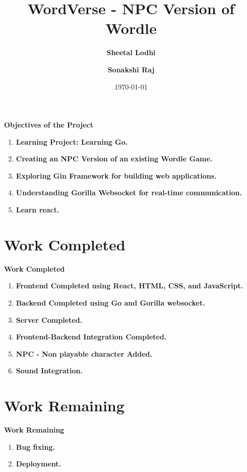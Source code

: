 \documentclass{beamer}
\title{WordVerse - NPC Version of Wordle}
\subtitle{}
\author{\bfseries Sheetal Lodhi \and \bfseries Sonakshi Raj }
\date{\today}
\begin{document}
\begin{frame}
    \titlepage 
\end{frame}

\section{}

\begin{frame}{\bfseries Objectives of the Project}
    \begin{enumerate}
        \item \bfseries Learning Project: Learning Go.
        \item \bfseries Creating an NPC Version of an existing Wordle Game.
        \item \bfseries Exploring Gin Framework for building web applications.
        \item \bfseries Understanding Gorilla Websocket for real-time communication.
        \item \bfseries Learn react.
    \end{enumerate}
\end{frame}

\section{Work Completed}

\begin{frame}{\bfseries Work Completed}
    \begin{enumerate}
        \item \bfseries Frontend Completed using React, HTML, CSS, and JavaScript.
        \item \bfseries Backend Completed using Go and Gorilla websocket.
        \item \bfseries Server Completed.
        \item \bfseries Frontend-Backend Integration Completed.
        \item \bfseries NPC - Non playable character Added.
        \item \bfseries Sound Integration.
    \end{enumerate}
\end{frame}

\section{Work Remaining}

\begin{frame}{\bfseries Work Remaining}
    \begin{enumerate}
        \item \bfseries Bug fixing.
        \item \bfseries Deployment.
    \end{enumerate}
\end{frame}
\end{document}
